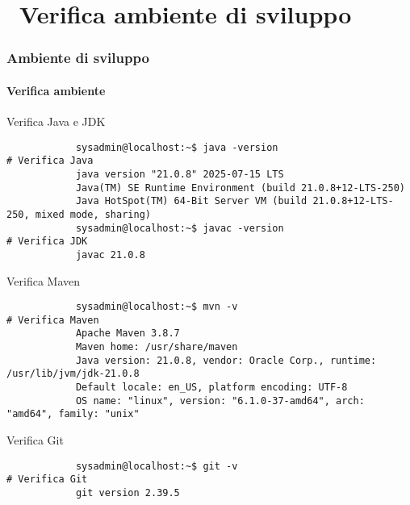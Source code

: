 \section{\faWrench\ Verifica ambiente di sviluppo} %
\label{sec:diy-check-dev-env}
%
\begin{frame}[t,fragile] \frametitle{Ambiente di sviluppo}
\framesubtitle{Verifica ambiente}
    \vspace*{-.5cm}
    \begin{codeblock}{Verifica Java e JDK}
        \begin{verbatim}
            sysadmin@localhost:~$ java -version                          # Verifica Java
            java version "21.0.8" 2025-07-15 LTS
            Java(TM) SE Runtime Environment (build 21.0.8+12-LTS-250)
            Java HotSpot(TM) 64-Bit Server VM (build 21.0.8+12-LTS-250, mixed mode, sharing)
            sysadmin@localhost:~$ javac -version                         # Verifica JDK
            javac 21.0.8
        \end{verbatim}
    \end{codeblock}
    \begin{codeblock}{Verifica Maven}
        \begin{verbatim}
            sysadmin@localhost:~$ mvn -v                                 # Verifica Maven
            Apache Maven 3.8.7
            Maven home: /usr/share/maven
            Java version: 21.0.8, vendor: Oracle Corp., runtime: /usr/lib/jvm/jdk-21.0.8
            Default locale: en_US, platform encoding: UTF-8
            OS name: "linux", version: "6.1.0-37-amd64", arch: "amd64", family: "unix"
        \end{verbatim}
    \end{codeblock}
    \begin{codeblock}{Verifica Git}   
        \begin{verbatim}
            sysadmin@localhost:~$ git -v                                 # Verifica Git
            git version 2.39.5
        \end{verbatim}
    \end{codeblock}
\end{frame}
%
